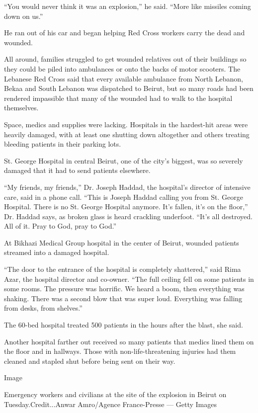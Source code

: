 ``You would never think it was an explosion,'' he said. ``More like
missiles coming down on us.''

He ran out of his car and began helping Red Cross workers carry the dead
and wounded.

All around, families struggled to get wounded relatives out of their
buildings so they could be piled into ambulances or onto the backs of
motor scooters. The Lebanese Red Cross said that every available
ambulance from North Lebanon, Bekaa and South Lebanon was dispatched to
Beirut, but so many roads had been rendered impassible that many of the
wounded had to walk to the hospital themselves.

Space, medics and supplies were lacking. Hospitals in the hardest-hit
areas were heavily damaged, with at least one shutting down altogether
and others treating bleeding patients in their parking lots.

St. George Hospital in central Beirut, one of the city's biggest, was so
severely damaged that it had to send patients elsewhere.

``My friends, my friends,'' Dr. Joseph Haddad, the hospital's director
of intensive care, said in a phone call. ``This is Joseph Haddad calling
you from St. George Hospital. There is no St. George Hospital anymore.
It's fallen, it's on the floor,'' Dr. Haddad says, as broken glass is
heard crackling underfoot. ``It's all destroyed. All of it. Pray to God,
pray to God.''

At Bikhazi Medical Group hospital in the center of Beirut, wounded
patients streamed into a damaged hospital.

``The door to the entrance of the hospital is completely shattered,''
said Rima Azar, the hospital director and co-owner. ``The full ceiling
fell on some patients in some rooms. The pressure was horrific. We heard
a boom, then everything was shaking. There was a second blow that was
super loud. Everything was falling from desks, from shelves.''

The 60-bed hospital treated 500 patients in the hours after the blast,
she said.

Another hospital farther out received so many patients that medics lined
them on the floor and in hallways. Those with non-life-threatening
injuries had them cleaned and stapled shut before being sent on their
way.

Image

Emergency workers and civilians at the site of the explosion in Beirut
on Tuesday.Credit...Anwar Amro/Agence France-Presse --- Getty Images

